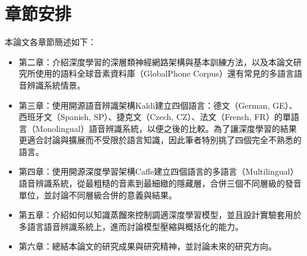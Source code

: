 \section{章節安排}
本論文各章節簡述如下：
\begin{itemize}
\itemsep -2pt %
  \item  第二章：介紹深度學習的深層類神經網路架構與基本訓練方法，以及本論文研究所使用的語料全球音素資料庫（GlobalPhone Corpus）\cite{schultz2013globalphone}還有常見的多語言語音辨識系統情景。

  \item  第三章：使用開源語音辨識架構Kaldi\cite{kaldi}建立四個語言：德文（German, GE）、西班牙文（Spanish, SP）、捷克文（Czech, CZ）、法文（French, FR）的單語言（Monolingual）語音辨識系統，以便之後的比較。為了讓深度學習的結果更適合討論與擴展而不受限於語言知識，因此筆者特別挑了四個完全不熟悉的語言。

  \item  第四章：使用開源深度學習架構Caffe\cite{jia2014caffe}建立四個語言的多語言（Multilingual）語音辨識系統，從最粗糙的音素到最細緻的隱藏層，合併三個不同層級的發音單位，並討論不同層級合併的意義與結果。

  \item  第五章：介紹如何以知識蒸餾來控制調適深度學習模型，並且設計實驗套用於多語言語音辨識系統上，進而討論模型壓縮與概括化的能力。
   
  \item  第六章：總結本論文的研究成果與研究精神，並討論未來的研究方向。
\end{itemize}

